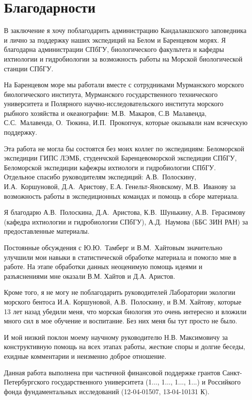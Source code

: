\section*{Благодарности}
В заключение я хочу поблагодарить администрацию Кандалакшского заповедника и лично  за поддержку наших экспедиций на Белом и Баренцевом морях.
Я благодарна администрации СПбГУ, биологического факультета и кафедры ихтиологии и гидробиологии за возможность работы на Морской биологической станции СПбГУ.

На Баренцевом море мы работали вместе с сотрудниками Мурманского морского биологического института, Мурманского государственного технического университета и Полярного научно-исследовательского института морского рыбного хозяйства и океанографии: М.В.~Макаров, С.В~Малавенда, С.\:С.~Малавенда, О.~Тюкина, И.\:П.~Прокопчук, которые оказывали нам всяческую поддержку.  

Эта работа не могла бы состоятся без моих коллег по экспедициям: Беломорской экспедиции ГИПС ЛЭМБ, студенчской Баренцевоморской экспедиции СПбГУ, Беломорской экспедиции кафежры ихтиологи и гидробиологии СПбГУ. 
Отдельное спасибо руководителям экспедиций: А.\:В.~Полоскину, И.\:А.~Коршуновой, Д.\:А.~Аристову, Е.\:А. Генельт-Яновскому, М.В.~Иванову за возможность работы в экспедиционных командах и помощь в сборе материала.

Я благодарю А.\:В.~Полоскина, Д.\:А.~Аристова, К.\:В.~Шунькину, А.\:В.~Герасимову (кафедра ихтиологии и гидробиологии СПбГУ), А.\:Д.~Наумова (ББС ЗИН РАН) за предоставленные материалы.

Постоянные обсуждения с Ю.\:Ю.~Тамберг и В.\:М.~Хайтовым значительно улучшили мои навыки в статистической обработке материала и помогло мне в работе.
На этапе обработки данных неоценимую помощь идеями и разъяснениями мне оказали В.\:М. Хайтов и Д.\:А. Аристов.


Кроме того, я не могу не поблагодарить руководителей Лаборатории экологии морского бентоса И.\:А. Коршуновой, А.\:В.~Полоскину,  и В.\:М. Хайтову, которые 13 лет назад убедили меня, что морская биология это очень интересно и вложили много сил в мое обучение и воспитание. 
Без них меня бы тут просто не было.

И мой низкий поклон моему научному руководителю Н.\:В. Максимовичу за конструктивную помощь на всех этапах работы, жесткие споры и долгие беседы, ехидные комментарии и  неизменно доброе отношение.

\vspace{3ex}

Данная работа выполнена при частичной финансовой поддержке грантов Санкт-Петер\-бург\-ского государственного университета (1..., 1..., 1..., 1...) и Российкого фонда фундаментальных исследований (12-04-01507, 13-04-10131 К). 

